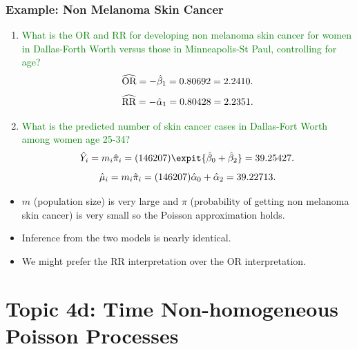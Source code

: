 \documentclass[oneside]{book}\usepackage[]{graphicx}\usepackage[svgnames]{xcolor}
\let\exp\relax%
\newcommand{\OR}{\text{OR}}%
\newcommand{\RR}{\text{RR}}%
\begin{document}
\subsubsection*{Example: Non Melanoma Skin Cancer}
\begin{enumerate}[1.]
    \item \textcolor{Green}{What is the OR and RR for developing non melanoma skin cancer for women in
              Dallas-Forth Worth versus those in Minneapolis-St Paul, controlling for age?}
          \[ \widehat{\OR}=\exp{-\hat{\beta}_1}=\exp{0.80692}=2.2410. \]
          \[ \widehat{\RR}=\exp{-\hat{\alpha}_1}=\exp{0.80428}=2.2351. \]
    \item \textcolor{Green}{What is the predicted number of skin cancer cases in Dallas-Fort Worth among
              women age 25-34?}
          \[ \hat{Y}_i=m_i\hat{\pi}_i=(146207)\expit{\hat{\beta}_0+\hat{\beta}_2}=39.25427. \]
          \[ \hat{\mu}_i=m_i\hat{\pi}_i=(146207)\exp{\hat{\alpha}_0+\hat{\alpha}_2}=39.22713. \]
\end{enumerate}
\begin{itemize}
    \item $m$ (population size) is very large and $ \pi $ (probability of getting non melanoma skin
          cancer) is very small so the Poisson approximation holds.
    \item Inference from the two models is nearly identical.
    \item We might prefer the RR interpretation over the OR interpretation.
\end{itemize}

\section*{Topic 4d: Time Non-homogeneous Poisson Processes}
\end{document}
